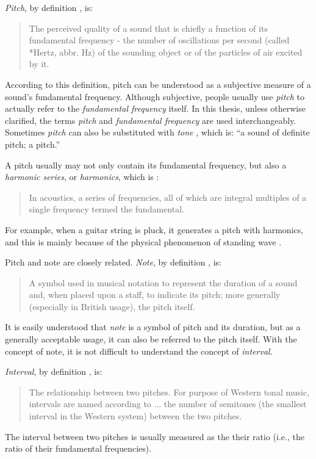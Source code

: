 {\it Pitch}, by definition \cite{randel1999harvard}, is:
\begin{quote}
The perceived quality of a sound that is chiefly a function of its fundamental frequency - the number of oscillations per second (called *Hertz, abbr. Hz) of the sounding object or of the particles of air excited by it.
\end{quote}
According to this definition, pitch can be understood as a subjective measure of a sound's fundamental frequency. Although subjective, people usually use {\it pitch} to actually refer to the {\it fundamental frequency} itself. In this thesis, unless otherwise clarified, the terms {\it pitch} and {\it fundamental frequency} are used interchangeably. Sometimes {\it pitch} can also be substituted with {\it tone} \cite{randel1999harvard}, which is: ``a sound of definite pitch; a pitch.''

A pitch usually may not only contain its fundamental frequency, but also a {\it harmonic series}, or {\it harmonics}, which is \cite{randel1999harvard}:
\begin{quote}
In acoustics, a series of frequencies, all of which are integral multiples of a single frequency termed the fundamental.
\end{quote}
For example, when a guitar string is pluck, it generates a pitch with harmonics, and this is mainly because of the physical phenomenon of standing wave \cite{helmholtz2009sensations}.

Pitch and note are closely related. {\it Note}, by definition \cite{randel1999harvard}, is:
\begin{quote}
A symbol used in musical notation to represent the duration of a sound and, when placed upon a staff, to indicate its pitch; more generally (especially in British usage), the pitch itself.
\end{quote}
It is easily understood that {\it note} is a symbol of pitch and its duration, but as a generally acceptable usage, it can also be referred to the pitch itself. With the concept of note, it is not difficult to understand the concept of {\it interval}.

{\it Interval}, by definition \cite{randel1999harvard}, is:
\begin{quote}
The relationship between two pitches. For purpose of Western tonal music, intervals are named according to ... the number of semitones (the smallest interval in the Western system) between the two pitches.
\end{quote}
The interval between two pitches is usually measured as the their ratio (i.e., the ratio of their fundamental frequencies).

